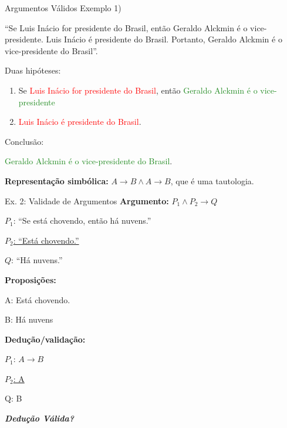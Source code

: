 \documentclass[aspectratio=169]{beamer}
\begin{document}
\begin{frame}{Argumentos Válidos}
    Exemplo 1)

    ``Se Luis Inácio for presidente do Brasil, então Geraldo Alckmin é o vice-presidente.
    Luis Inácio é presidente do Brasil. Portanto, Geraldo Alckmin é o vice-presidente do Brasil''.
    \vspace{5mm}

    Duas hipóteses:
    \begin{enumerate}
        \item Se \textcolor{red}{Luis Inácio for presidente do Brasil}, então \textcolor{ForestGreen}{Geraldo Alckmin é o vice-presidente}
        \item \textcolor{red}{Luis Inácio é presidente do Brasil}.
    \end{enumerate}

    Conclusão:

    \textcolor{ForestGreen}{Geraldo Alckmin é o vice-presidente do Brasil}.

    \vspace{3mm}
    \textbf{Representação simbólica:} $A \rightarrow B \wedge A \rightarrow B$, que é uma tautologia.


\end{frame}

\begin{frame}{Ex. 2: Validade de Argumentos}
    \textbf{Argumento:} $P_1 \wedge P_2 \rightarrow Q$

    $P_1$: ``Se está chovendo, então há nuvens.''

    \underline{$P_2$: ``Está chovendo.''}

    $Q$: ``Há nuvens.''

    \vspace{3mm}
    \textbf{Proposições:}

    A: Está chovendo.

    B: Há nuvens
    \vspace{3mm}

    \textbf{Dedução/validação:}

    $P_1$: $A \rightarrow B$

    \underline{$P_2$: A}

    Q: B
    \vspace{4mm}

    \textit{\textbf{Dedução Válida?}}


\end{frame}
\end{document}
